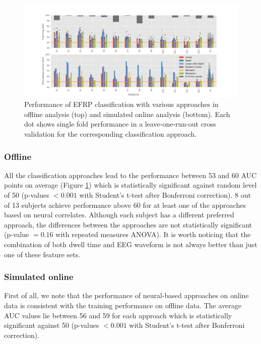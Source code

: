 \documentclass[12pt]{iopart}
\begin{document}
\begin{figure}[!t]
    \includegraphics[trim={2cm 0cm 2cm 0cm},clip,width=1.1\columnwidth]{../images/ClassificationAll.png}
    \caption{Performance of EFRP classification with various approaches in offline analysis (top)
    and simulated online analysis (bottom). Each dot shows single fold performance
    in a leave-one-run-out cross validation for the corresponding classification approach.}
\label{fig:classAll}
\end{figure}

\subsubsection*{Offline}
All the classification approaches lead to the performance between 53 and 60 AUC points on average
(Figure \ref{fig:classAll})
which is statistically significant against random level of 50 
(p-values $< 0.001$ with Student's t-test after Bonferroni correction).
8 out of 13 subjects achieve performance above 60 for at least one of the approaches based
on neural correlates.
Although each subject has a different preferred approach, the differences between
the approaches are not statistically significant (p-value $= 0.16$ with repeated measures ANOVA).
It is worth noticing that the combination of both dwell time and EEG waveform is not always
better than just one of these feature sets.

\subsubsection*{Simulated online}
First of all, we note that the performance of neural-based approaches 
on online data is consistent with the training performance on offline data.
The average AUC values lie between 56 and 59 for each approach
which is statistically significant against 50
(p-values $< 0.001$ with Student's t-test after Bonferroni correction).
\end{document}
